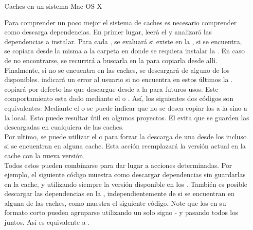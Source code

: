\begin{folders}[h]
	\caption{Caches en un sistema Mac OS X}
	\label{folders:repos:osx}
\end{folders}

Para comprender un poco mejor el sistema de caches es necesario comprender como 
\fronttier descarga dependencias. En primer lugar, \fronttier leerá el \conffile
y analizará las dependencias a instalar. Para cada \dependency, se evaluará si 
existe en la \cachel, si se encuentra, se copiara desde la misma a la carpeta 
en donde se requiera instalar la \dependency. En caso de no encontrarse, se 
recurrirá a buscarla en la \cacheg para copiarla desde allí. Finalmente, si no 
se encuentra en las caches, se descargará de alguno de los \onlinerepo 
disponibles. \fronttier indicará un error al usuario si no encuentra en estos 
últimos la \dependency.\\
\fronttier copiará por defecto las \dependencies que descargue desde 
\onlinerepo a la \cacheg para futuros usos. Este comportamiento esta
dado mediante el \flag {} o . Así, los siguientes dos 
códigos son equivalentes:
Mediante el \flag {} o  se puede indicar que no se 
desea copiar las \dependencies a la \cacheg sino a la local. Esto puede 
resultar útil en algunos proyectos. El \flag {} evita que se 
guarden las \dependencies descargadas en cualquiera de las caches.\\
Por ultimo, se puede utilizar el \flag {} o  para 
forzar la descarga de una \dependency desde los \onlinerepo incluso si
se encuentran en alguna cache. Esta acción reemplazará la versión actual en
la cache con la nueva versión.\\
Todos estos \flags pueden combinarse para dar lugar a acciones determinadas. Por 
ejemplo, el siguiente código muestra como descargar dependencias sin guardarlas
en la cache, y utilizando siempre la versión disponible en los \onlinerepo.
También es posible descargar las dependencias en la \cachel, independientemente 
de si se encuentran en alguna de las caches, como muestra el siguiente código.
Note que los \flags en su formato corto pueden agruparse utilizando un solo 
signo - y pasando todos los \flags juntos. Así  es equivalente a 
 .


